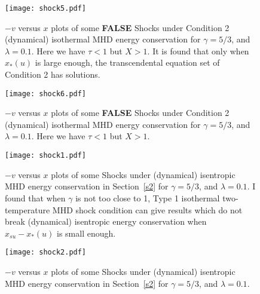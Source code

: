 \documentclass[fleqn,usenatbib]{mnras}
\begin{document}
\begin{figure}
\centering
\texttt{[image: shock5.pdf]}
\caption{$-v$ versus $x$ plots of some \textbf{FALSE} Shocks under Condition 2 (dynamical) isothermal MHD energy conservation for $\gamma=5/3$, and $\lambda=0.1$. Here we have $\tau<1$ but $X>1$. It is found that only when $x_{*}(u)$ is large enough, the transcendental equation set of Condition 2 has solutions.}
\label{3}
\end{figure}

\begin{figure}
\centering
\texttt{[image: shock6.pdf]}
\caption{$-v$ versus $x$ plots of some \textbf{FALSE} Shocks under Condition 2 (dynamical) isothermal MHD energy conservation for $\gamma=5/3$, and $\lambda=0.1$. Here we have $\tau<1$ but $X>1$.}
\label{4}
\end{figure}

\begin{figure}
\centering
\texttt{[image: shock1.pdf]}
\caption{$-v$ versus $x$ plots of some Shocks under (dynamical) isentropic MHD energy conservation in Section~\ref{s2} for $\gamma=5/3$, and $\lambda=0.1$. I found that when $\gamma$ is not too close to 1, Type 1 isothermal two-temperature MHD shock condition can give results which do not break (dynamical) isentropic energy conservation when $x_{su}-x_{*}(u)$ is small enough.}
\label{5}
\end{figure}

\begin{figure}
\centering
\texttt{[image: shock2.pdf]}
\caption{$-v$ versus $x$ plots of some Shocks under (dynamical) isentropic MHD energy conservation in Section~\ref{s2} for $\gamma=5/3$, and $\lambda=0.1$. }
\label{6}
\end{figure}


 

\label{lastpage}
\end{document}
